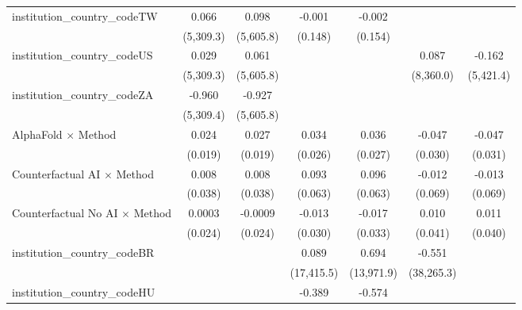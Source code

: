 \begin{tabular}{lcccccc}
   institution\_country\_codeTW          & 0.066         & 0.098         & -0.001         & -0.002         &                &   \\   
                                         & (5,309.3)     & (5,605.8)     & (0.148)        & (0.154)        &                &   \\   
   institution\_country\_codeUS          & 0.029         & 0.061         &                &                & 0.087          & -0.162\\   
                                         & (5,309.3)     & (5,605.8)     &                &                & (8,360.0)      & (5,421.4)\\   
   institution\_country\_codeZA          & -0.960        & -0.927        &                &                &                &   \\   
                                         & (5,309.4)     & (5,605.8)     &                &                &                &   \\   
   AlphaFold $\times$ Method             & 0.024         & 0.027         & 0.034          & 0.036          & -0.047         & -0.047\\   
                                         & (0.019)       & (0.019)       & (0.026)        & (0.027)        & (0.030)        & (0.031)\\   
   Counterfactual AI $\times$ Method     & 0.008         & 0.008         & 0.093          & 0.096          & -0.012         & -0.013\\   
                                         & (0.038)       & (0.038)       & (0.063)        & (0.063)        & (0.069)        & (0.069)\\   
   Counterfactual No AI $\times$ Method  & 0.0003        & -0.0009       & -0.013         & -0.017         & 0.010          & 0.011\\   
                                         & (0.024)       & (0.024)       & (0.030)        & (0.033)        & (0.041)        & (0.040)\\   
   institution\_country\_codeBR          &               &               & 0.089          & 0.694          & -0.551         &   \\   
                                         &               &               & (17,415.5)     & (13,971.9)     & (38,265.3)     &   \\   
   institution\_country\_codeHU          &               &               & -0.389         & -0.574         &                &   \\   

\end{tabular}

